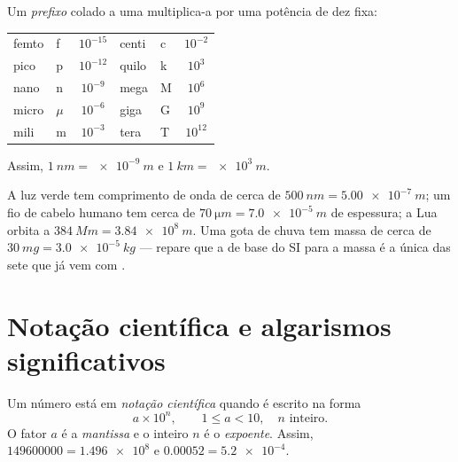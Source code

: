 \begin{definition}[Prefixos do SI]\label{def:g10:orders-of-magnitude:prefixes}
Um \emph{prefixo} colado a uma  multiplica-a
por uma potência de dez fixa:
\begin{center}
\begin{tabular}{llc@{\qquad\qquad}llc}
femto & f & $10^{-15}$ & centi & c & $10^{-2}$ \\
pico  & p & $10^{-12}$ & quilo & k & $10^{3}$  \\
nano  & n & $10^{-9}$  & mega  & M & $10^{6}$  \\
micro & $\mu$ & $10^{-6}$ & giga & G & $10^{9}$ \\
mili  & m & $10^{-3}$  & tera  & T & $10^{12}$ \\
\end{tabular}
\end{center}
Assim, $\qty{1}{nm} = \qty{e-9}{m}$ e $\qty{1}{km} = \qty{e3}{m}$.
\end{definition}

\begin{example}\label{ex:g10:orders-of-magnitude:prefixes}
A luz verde tem comprimento de onda de cerca de
$\qty{500}{nm} = \qty{5.00e-7}{m}$; um fio de cabelo humano tem cerca de
$\qty{70}{\micro m} = \qty{7.0e-5}{m}$ de espessura; a Lua orbita a
$\qty{384}{Mm} = \qty{3.84e8}{m}$. Uma gota de chuva tem massa de cerca
de $\qty{30}{mg} = \qty{3.0e-5}{kg}$ --- repare que a  de base do
SI para a massa é a única das sete que já vem com .
\end{example}

\section{Notação científica e algarismos significativos}

\begin{definition}\label{def:g10:orders-of-magnitude:scinot}
Um número está em \emph{notação científica}
quando é escrito na forma
\[
a \times 10^{n}, \qquad 1 \leq a < 10, \quad n \text{ inteiro.}
\]
O fator $a$ é a \emph{mantissa} e o inteiro $n$ é o
\emph{expoente}. Assim,
$\num{149600000} = \num{1.496e8}$ e $\num{0.00052} = \num{5.2e-4}$.
\end{definition}

